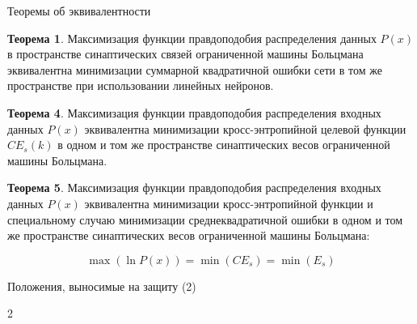 \documentclass[10pt]{beamer}
\begin{document}
        \begin{frame}{Теоремы об эквивалентности}
            \begin{block}{}
                \textbf{Теорема 1}. Максимизация функции правдоподобия распределения данных $P(x)$ в пространстве синаптических связей ограниченной машины Больцмана эквивалентна минимизации суммарной квадратичной ошибки сети в том же пространстве при использовании линейных нейронов.
            \end{block}

            \begin{block}{}
                \textbf{Теорема 4}. Максимизация функции правдоподобия распределения входных данных $P(x)$ эквивалентна минимизации кросс-энтропийной целевой функции $CE_s(k)$ в одном и том же пространстве синаптических весов ограниченной машины Больцмана.
            \end{block}

            \begin{block}{}
                \textbf{Теорема 5}. Максимизация функции правдоподобия распределения входных данных $P(x)$ эквивалентна минимизации кросс-энтропийной функции и специальному случаю минимизации среднеквадратичной ошибки в одном и том же пространстве синаптических весов ограниченной машины Больцмана:
    
                \begin{equation*}
                	\max(\ln P(x)) = \min(CE_s) = \min(E_s)
                \end{equation*}
            \end{block}
        \end{frame}

        \begin{frame}{Положения, выносимые на защиту (2)}
            \begin{block}{2}
                \large
            \end{block}
        \end{frame}
\end{document}
